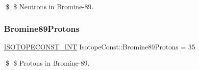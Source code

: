 \$ \$ Neutrons in Bromine-\/89. \mbox{\label{group___isotope_const-_bromine-_br89_gae82570bc0041cfc7214eedcbc809b159}} 
\subsubsection{\texorpdfstring{Bromine89\+Protons}{Bromine89Protons}}
{\footnotesize\ttfamily \mbox{\hyperlink{group___isotope_const-_macros_ga5f18360b3e99483a35c32d789e62621c}{I\+S\+O\+T\+O\+P\+E\+C\+O\+N\+S\+T\+\_\+\+I\+NT}} Isotope\+Const\+::\+Bromine89\+Protons = 35}

\$ \$ Protons in Bromine-\/89. 